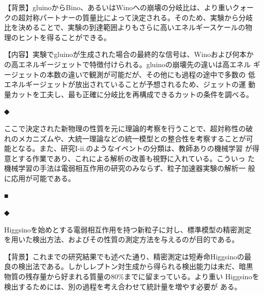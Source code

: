 \documentclass[11pt,a4paper,twoside,dvipdfmx]{jarticle}		%
\newcommand{\研究課題名}{粒子加速器を用いた電弱相互作用を持つ新物理の探索}
\newcommand{\研究機関名}{東京大学}
\newcommand{\申請者氏名}{千草颯}
\newcommand{\研究代表者氏名}{\申請者氏名}
\newcommand{\研究期間の最終元号年度}{34}	%
\begin{document}
{\vspace*{1mm}


\vspace*{1mm}

【背景】gluinoからBino、あるいはWinoへの崩壊の分岐比は、より重いクォー
クの超対称パートナーの質量比によって決定される。そのため、実験から分岐
比を決めることで、実験の到達範囲よりもさらに高いエネルギースケールの物
理のヒントを得ることができる。


【内容】実験でgluinoが生成された場合の最終的な信号は、Winoおよび何本か
の高エネルギージェットで特徴付けられる。gluinoの崩壊先の違いは高エネル
ギージェットの本数の違いで観測が可能だが、その他にも過程の途中で多数の
低エネルギージェットが放出されていることが予想されるため、ジェットの運
動量カットを工夫し、最も正確に分岐比を再構成できるカットの条件を調べる。

\vspace*{1mm}

◆ 

\vspace*{1mm}

ここで決定された新物理の性質を元に理論的考察を行うことで、超対称性の破
れのメカニズムや、大統一理論などの統一模型との整合性を考察することが可
能となる。また、研究I-ii.のようなイベントの分類は、教師ありの機械学習
が得意とする作業であり、これによる解析の改善も視野に入れている。こういっ
た機械学習の手法は電弱相互作用の研究のみならず、粒子加速器実験の解析一
般に応用が可能である。

\vspace*{1mm}

■ 

\vspace*{1mm}

◆ 

\vspace*{1mm}

Higgsinoを始めとする電弱相互作用を持つ新粒子に対し、標準模型の精密測定
を用いた検出方法、およびその性質の測定方法を与えるのが目的である。

\vspace*{1mm}


【背景】これまでの研究結果でも述べた通り、精密測定は短寿命Higgsinoの最
良の検出法である。しかしレプトン対生成から得られる検出能力は未だ、暗黒
物質の残存量から好まれる質量の$80\%$までに留まっている。より重い
Higgsinoを検出するためには、別の過程を考え合わせて統計量を増やす必要が
ある。

}
\end{document}
